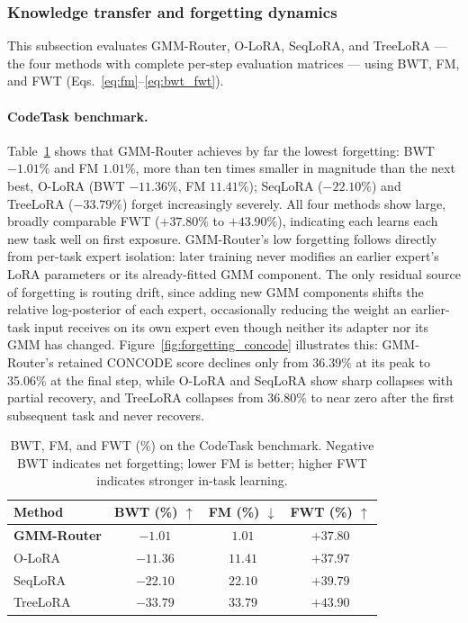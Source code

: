 \subsubsection{Knowledge transfer and forgetting dynamics}
\label{sec:forgetting}

This subsection evaluates GMM-Router, O-LoRA, SeqLoRA, and TreeLoRA --- the four methods with complete per-step evaluation matrices --- using BWT, FM, and FWT (Eqs.~\eqref{eq:fm}--\eqref{eq:bwt_fwt}).

\paragraph{CodeTask benchmark.} Table~\ref{tab:bwt_codetask} shows that GMM-Router achieves by far the lowest forgetting: BWT $-1.01\%$ and FM $1.01\%$, more than ten times smaller in magnitude than the next best, O-LoRA (BWT $-11.36\%$, FM $11.41\%$); SeqLoRA ($-22.10\%$) and TreeLoRA ($-33.79\%$) forget increasingly severely. All four methods show large, broadly comparable FWT ($+37.80\%$ to $+43.90\%$), indicating each learns each new task well on first exposure. GMM-Router's low forgetting follows directly from per-task expert isolation: later training never modifies an earlier expert's LoRA parameters or its already-fitted GMM component. The only residual source of forgetting is routing drift, since adding new GMM components shifts the relative log-posterior of each expert, occasionally reducing the weight an earlier-task input receives on its own expert even though neither its adapter nor its GMM has changed. Figure~\ref{fig:forgetting_concode} illustrates this: GMM-Router's retained CONCODE score declines only from $36.39\%$ at its peak to $35.06\%$ at the final step, while O-LoRA and SeqLoRA show sharp collapses with partial recovery, and TreeLoRA collapses from $36.80\%$ to near zero after the first subsequent task and never recovers.

\begin{table}[t]
\centering
\caption{BWT, FM, and FWT (\%) on the CodeTask benchmark. Negative BWT indicates net forgetting; lower FM is better; higher FWT indicates stronger in-task learning.}
\label{tab:bwt_codetask}
\small
\begin{tabular}{lccc}
\toprule
Method & BWT (\%) $\uparrow$ & FM (\%) $\downarrow$ & FWT (\%) $\uparrow$ \\
\midrule
\textbf{GMM-Router} & $-1.01$ & $1.01$ & $+37.80$ \\
O-LoRA     & $-11.36$ & $11.41$ & $+37.97$ \\
SeqLoRA    & $-22.10$ & $22.10$ & $+39.79$ \\
TreeLoRA   & $-33.79$ & $33.79$ & $+43.90$ \\
\bottomrule
\end{tabular}
\end{table}

